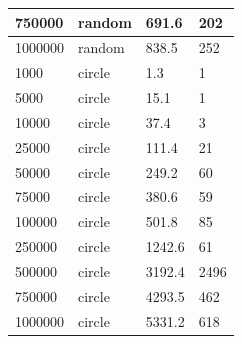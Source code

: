 \documentclass[12pt]{article}
\begin{document}
\begin{table}[h!]
\begin{tabular}{|l|l|l|l|}
750000  & random & 691.6                     & 202               \\ \hline
1000000 & random & 838.5                     & 252               \\ \hline
1000    & circle & 1.3                       & 1                 \\ \hline
5000    & circle & 15.1                      & 1                 \\ \hline
10000   & circle & 37.4                      & 3                 \\ \hline
25000   & circle & 111.4                     & 21                \\ \hline
50000   & circle & 249.2                     & 60                \\ \hline
75000   & circle & 380.6                     & 59                \\ \hline
100000  & circle & 501.8                     & 85                \\ \hline
250000  & circle & 1242.6                    & 61                \\ \hline
500000  & circle & 3192.4                    & 2496              \\ \hline
750000  & circle & 4293.5                    & 462               \\ \hline
1000000 & circle & 5331.2                    & 618               \\ \hline
\end{tabular}
\label{tab:QuickHull}
\end{table}
\end{document}
